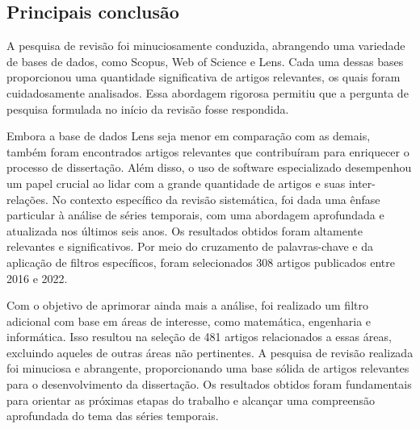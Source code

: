 \subsection{Principais conclus\~ao} \label{subsec:conclusão da revisão}

A pesquisa de revisão foi minuciosamente conduzida, abrangendo uma variedade de bases de dados, como Scopus, Web of Science e Lens. Cada uma dessas bases proporcionou uma quantidade significativa de artigos relevantes, os quais foram cuidadosamente analisados. Essa abordagem rigorosa permitiu que a pergunta de pesquisa formulada no início da revisão fosse respondida.

Embora a base de dados Lens seja menor em comparação com as demais, também foram encontrados artigos relevantes que contribuíram para enriquecer o processo de dissertação. Além disso, o uso de software especializado desempenhou um papel crucial ao lidar com a grande quantidade de artigos e suas inter-relações.
No contexto específico da revisão sistemática, foi dada uma ênfase particular à análise de séries temporais, com uma abordagem aprofundada e atualizada nos últimos seis anos. Os resultados obtidos foram altamente relevantes e significativos. Por meio do cruzamento de palavras-chave e da aplicação de filtros específicos, foram selecionados 308 artigos publicados entre 2016 e 2022.

Com o objetivo de aprimorar ainda mais a análise, foi realizado um filtro adicional com base em áreas de interesse, como matemática, engenharia e informática. Isso resultou na seleção de 481 artigos relacionados a essas áreas, excluindo aqueles de outras áreas não pertinentes.
A pesquisa de revisão realizada foi minuciosa e abrangente, proporcionando uma base sólida de artigos relevantes para o desenvolvimento da dissertação. Os resultados obtidos foram fundamentais para orientar as próximas etapas do trabalho e alcançar uma compreensão aprofundada do tema das séries temporais.